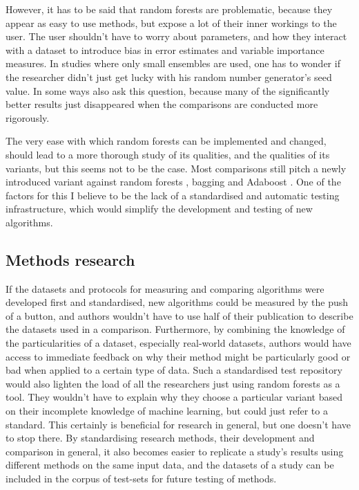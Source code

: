 \documentclass[a4paper,man,12pt,apacite,floatsintext,draftfirst]{apa6} %
\begin{document}
However, it has to be said that random forests are problematic,
because they appear as easy to use methods, but expose a lot of their
inner workings to the user.
The user shouldn't have to worry about parameters, and how they interact
with a dataset to introduce bias in error estimates and
variable importance measures.
In studies where only small ensembles are used, one has to wonder if the
researcher didn't just get lucky with his random number generator's seed value.
In some ways \cite{banfield2007comparison} also ask this question,
because many of the significantly better results just disappeared when
the comparisons are conducted more rigorously.

The very ease with which random forests can be implemented and changed,
should lead to a more thorough study of its qualities,
and the qualities of its variants, but this seems not to be the case.
Most comparisons still pitch a newly introduced variant against random forests
\cite{breiman2001random}, bagging \cite{breiman1996bagging}
and Adaboost \cite{freund1995decision}.
One of the factors for this I believe to be the lack of a standardised
and automatic testing infrastructure, which would simplify the development
and testing of new algorithms.

\subsection{Methods research}
If the datasets and protocols for measuring and comparing algorithms were
developed first and standardised, new algorithms could be measured by the
push of a button, and authors wouldn't have to use half of their publication
to describe the datasets used in a comparison.
Furthermore, by combining the knowledge of the particularities of a dataset,
especially real-world datasets, authors would have access to immediate
feedback on why their method might be particularly good or bad when applied
to a certain type of data.
Such a standardised test repository would also lighten the load of all the
researchers just using random forests as a tool.
They wouldn't have to explain why they choose a particular variant based on
their incomplete knowledge of machine learning, but could just refer to
a standard.
This certainly is beneficial for research in general, but one doesn't have
to stop there.
By standardising research methods, their development and comparison
in general, it also becomes easier to replicate a study's results using
different methods on the same input data, and the datasets of a study can
be included in the corpus of test-sets for future testing of methods.
\end{document}
